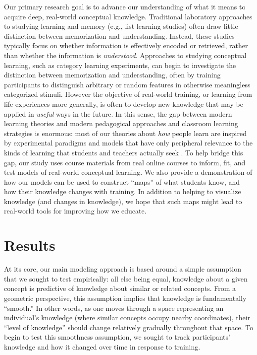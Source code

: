 \documentclass[10pt]{article}
\begin{document}
Our primary research goal is to advance our understanding of what it means to
acquire deep, real-world conceptual knowledge. Traditional laboratory approaches
to studying learning and memory (e.g., list learning studies) often draw little
distinction between memorization and understanding. Instead, these studies
typically focus on whether information is effectively encoded or retrieved,
rather than whether the information is \textit{understood}. Approaches to
studying conceptual learning, such as category learning experiments, can begin
to investigate the distinction between memorization and understanding, often by
training participants to distinguish arbitrary or random features in otherwise
meaningless categorized stimuli. However the objective of real-world training,
or learning from life experiences more generally, is often to develop new
knowledge that may be applied in \textit{useful} ways in the future. In this
sense, the gap between modern learning theories and modern pedagogical
approaches and classroom learning strategies is enormous: most of our theories
about \textit{how} people learn are inspired by experimental paradigms and
models that have only peripheral relevance to the kinds of learning that
students and teachers actually seek \citep{Macl05, HallGree08}. To help bridge this gap, our study uses
course materials from real online courses to inform, fit, and test models of
real-world conceptual learning. We also provide a
demonstration of how our models can be used to construct ``maps'' of what
students know, and how their knowledge changes with training. In addition to
helping to visualize knowledge (and changes in knowledge), we hope that such
maps might lead to real-world tools for improving how we educate.

\section*{Results}

At its core, our main modeling approach is based around a simple assumption
that we sought to test empirically: all else being equal, knowledge about a
given concept is predictive of knowledge about similar or related concepts.
From a geometric perspective, this assumption implies that knowledge is
fundamentally ``smooth.'' In other words, as one moves through a space
representing an individual's knowledge (where similar concepts occupy nearby
coordinates), their ``level of knowledge'' should change relatively gradually
throughout that space. To begin to test this smoothness assumption, we sought
to track participants' knowledge and how it changed over time in response
to training.
\end{document}
